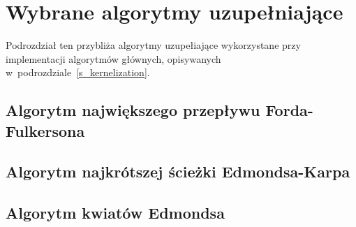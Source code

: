 \section{Wybrane algorytmy uzupełniające}\label{s_supplementary_algorithms}
\par{
  Podrozdział ten przybliża algorytmy uzupełiające wykorzystane przy 
  implementacji algorytmów głównych, opisywanych 
  w~podrozdziale~\ref{s_kernelization}.
}

\subsection{Algorytm największego przepływu Forda-Fulkersona}\label{ss_ford_fulkerson}
\subsection{Algorytm najkrótszej ścieżki Edmondsa-Karpa}\label{ss_edmonds_karp}
\subsection{Algorytm kwiatów Edmondsa}\label{ss_edmonds}




